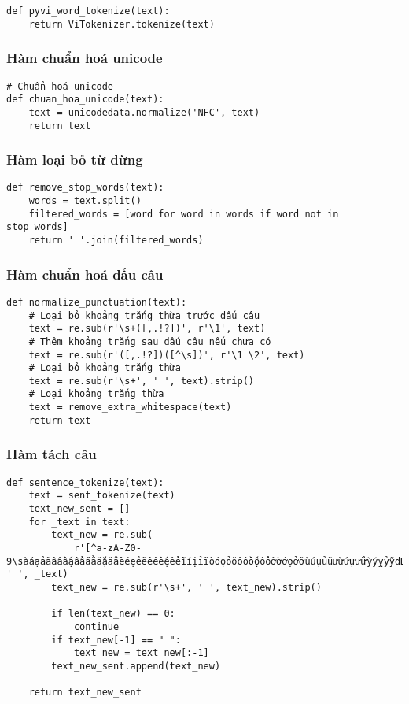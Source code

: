 \begin{verbatim}
def pyvi_word_tokenize(text):
    return ViTokenizer.tokenize(text)
\end{verbatim}

\subsubsection{Hàm chuẩn hoá unicode}


\begin{verbatim}
# Chuẩn hoá unicode
def chuan_hoa_unicode(text):
    text = unicodedata.normalize('NFC', text)
    return text
\end{verbatim}
\subsubsection{Hàm loại bỏ từ dừng}

\begin{verbatim}
def remove_stop_words(text):
    words = text.split()
    filtered_words = [word for word in words if word not in stop_words]
    return ' '.join(filtered_words)
\end{verbatim}
\subsubsection{Hàm chuẩn hoá dấu câu}
\begin{verbatim}
def normalize_punctuation(text):
    # Loại bỏ khoảng trắng thừa trước dấu câu
    text = re.sub(r'\s+([,.!?])', r'\1', text)
    # Thêm khoảng trắng sau dấu câu nếu chưa có
    text = re.sub(r'([,.!?])([^\s])', r'\1 \2', text)
    # Loại bỏ khoảng trắng thừa
    text = re.sub(r'\s+', ' ', text).strip()
    # Loại khoảng trắng thừa
    text = remove_extra_whitespace(text)
    return text
\end{verbatim}

\subsubsection{Hàm tách câu}


\begin{verbatim}
def sentence_tokenize(text):
    text = sent_tokenize(text)
    text_new_sent = []
    for _text in text:
        text_new = re.sub(
            r'[^a-zA-Z0-9\sàáạảãâầấậẩẫăằắặẳẵèéẹẻẽêềếệểễìíịỉĩòóọỏõôồốộổỗơờớợởỡùúụủũưừứựửữỳýỵỷỹđĐÀÁẠẢÃÂẦẤẬẨẪĂẰẮẶẲẴÈÉẸẺẼÊỀẾỆỂỄÌÍỊỈĨÒÓỌỎÕÔỒỐỘỔỖƠỜỚỢỞỠÙÚỤỦŨƯỪỨỰỬỮỲÝỴỶỸ_]', ' ', _text)
        text_new = re.sub(r'\s+', ' ', text_new).strip()
        
        if len(text_new) == 0:
            continue
        if text_new[-1] == " ":
            text_new = text_new[:-1]
        text_new_sent.append(text_new)

    return text_new_sent
\end{verbatim}

